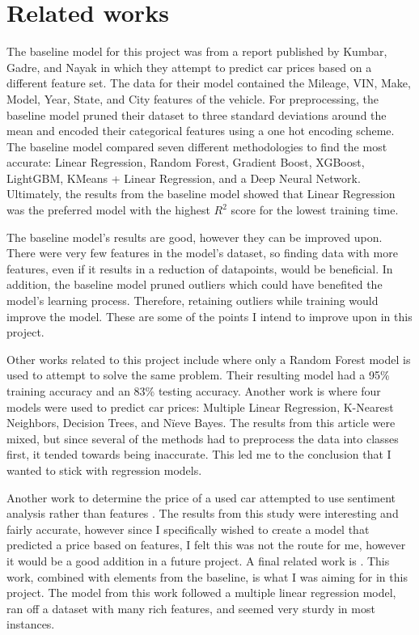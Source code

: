 \documentclass[compsoc]{IEEEtran}
\begin{document}
\section{Related works} 
The baseline model for this project was from a report published by Kumbar, Gadre, and Nayak \cite{baseline} in which they attempt to predict car prices based on a different feature set. The data for their model contained the Mileage, VIN, Make, Model, Year, State, and City features of the vehicle. For preprocessing, the baseline model pruned their dataset to three standard deviations around the mean and encoded their categorical features using a one hot encoding scheme. The baseline model compared seven different methodologies to find the most accurate: Linear Regression, Random Forest, Gradient Boost, XGBoost, LightGBM, KMeans + Linear Regression, and a Deep Neural Network. Ultimately, the results from the baseline model showed that Linear Regression was the preferred model with the highest $R^2$ score for the lowest training time.

The baseline model's results are good, however they can be improved upon. There were very few features in the model's dataset, so finding data with more features, even if it results in a reduction of datapoints, would be beneficial. In addition, the baseline model pruned outliers which could have benefited the model's learning process. Therefore, retaining outliers while training would improve the model. These are some of the points I intend to improve upon in this project.

Other works related to this project include \cite{article:prediction1} where only a Random Forest model is used to attempt to solve the same problem. Their resulting model had a 95\% training accuracy and an 83\% testing accuracy. Another work is \cite{article:prediction2} where four models were used to predict car prices: Multiple Linear Regression, K-Nearest Neighbors, Decision Trees, and Nïeve Bayes. The results from this article were mixed, but since several of the methods had to preprocess the data into classes first, it tended towards being inaccurate. This led me to the conclusion that I wanted to stick with regression models.

Another work to determine the price of a used car attempted to use sentiment analysis rather than features \cite{article:prediction3}. The results from this study were interesting and fairly accurate, however since I specifically wished to create a model that predicted a price based on features, I felt this was not the route for me, however it would be a good addition in a future project. A final related work is \cite{article:prediction4}. This work, combined with elements from the baseline, is what I was aiming for in this project. The model from this work followed a multiple linear regression model, ran off a dataset with many rich features, and seemed very sturdy in most instances. 
\end{document}
